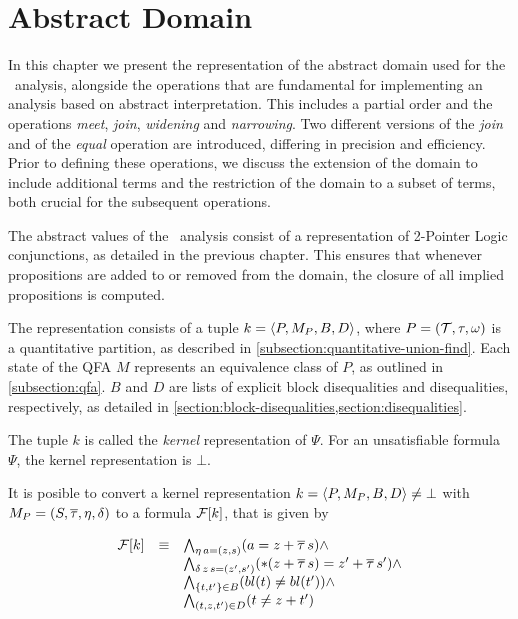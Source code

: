 \chapter{Abstract Domain}

In this chapter we present the representation of the abstract domain used for the \cpo\ analysis, alongside the operations that are fundamental for implementing an analysis based on abstract interpretation.
This includes a partial order and the operations \emph{meet}, \emph{join}, \emph{widening} and \emph{narrowing}.
Two different versions of the \emph{join} and of the \emph{equal} operation are introduced,
differing in precision and efficiency.
Prior to defining these operations, we discuss the extension of the domain to include additional terms and the restriction of the domain to a subset of terms,
both crucial for the subsequent operations.

The abstract values of the \cpo\ analysis consist of a representation
of 2-Pointer Logic conjunctions, as detailed in the previous chapter.
This ensures that whenever propositions are added to or removed from the domain,
the closure of all implied propositions is computed.

The representation consists of a tuple $k = \langle P,M_P,B,D\rangle$,
where $P = (\mathcal{T}, \tau, \omega)$ is a quantitative partition, as described in \cref{subsection:quantitative-union-find}.
Each state of the QFA $M$ represents an equivalence class of $P$, as outlined in \cref{subsection:qfa}.
$B$ and $D$ are lists of explicit block disequalities and disequalities, respectively, as detailed in \cref{section:block-disequalities,section:disequalities}.

The tuple $k$ is called the \emph{kernel} representation of $\Psi$.
For an unsatisfiable formula $\Psi$, the kernel representation is $\bot$.

It is posible to convert a kernel representation $k = \langle P,M_P,B,D\rangle \neq \bot$ with $M_P = (S, \overline{\tau}, \eta, \delta)$ to a formula $\mathcal{F}[k]$, that is given by

\[
    \begin{array}{lll}
        \mathcal{F}[k] & \equiv & \bigwedge_{\eta\,a=(z,s)} (a = z + \overline{\tau}\,s) \land                        \\
              &        & \bigwedge_{\delta\,z\,s=(z',s')} (*(z + \overline{\tau}\,s) = z' + \overline{\tau}\,s') \land \\
              &        & \bigwedge_{\{t, t'\} \in B} (bl(t) \neq bl(t')) \land                     \\
              &        & \bigwedge_{(t, z, t') \in D} (t \neq z + t')
    \end{array}
\]

